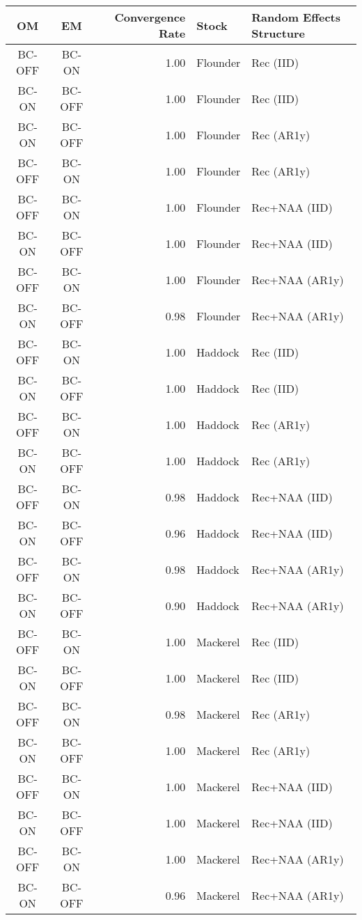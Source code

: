 \begin{table}[H]
\centering
\begin{tabular}{ccrll}
\toprule
OM & EM & Convergence Rate & Stock & Random Effects Structure \\
\midrule
BC-OFF  & BC-ON & 1.00 & Flounder & Rec (IID) \\
BC-ON  & BC-OFF & 1.00 & Flounder & Rec (IID) \\
\addlinespace
BC-ON  & BC-OFF & 1.00 & Flounder & Rec (AR1y) \\
BC-OFF  & BC-ON & 1.00 & Flounder & Rec (AR1y) \\
\addlinespace
BC-OFF  & BC-ON & 1.00 & Flounder & Rec+NAA (IID) \\
BC-ON & BC-OFF & 1.00 & Flounder & Rec+NAA (IID) \\
\addlinespace
BC-OFF & BC-ON & 1.00 & Flounder & Rec+NAA (AR1y) \\
BC-ON & BC-OFF & 0.98 & Flounder & Rec+NAA (AR1y) \\
\midrule
BC-OFF  & BC-ON & 1.00 & Haddock  & Rec (IID) \\
BC-ON  & BC-OFF & 1.00 & Haddock  & Rec (IID) \\
\addlinespace
BC-OFF  & BC-ON & 1.00 & Haddock  & Rec (AR1y) \\
BC-ON  & BC-OFF & 1.00 & Haddock  & Rec (AR1y) \\
\addlinespace
BC-OFF  & BC-ON & 0.98 & Haddock  & Rec+NAA (IID) \\
BC-ON & BC-OFF & 0.96 & Haddock  & Rec+NAA (IID) \\
\addlinespace
BC-OFF & BC-ON & 0.98 & Haddock  & Rec+NAA (AR1y) \\
BC-ON & BC-OFF & 0.90 & Haddock  & Rec+NAA (AR1y) \\
\midrule
BC-OFF  & BC-ON & 1.00 & Mackerel & Rec (IID) \\
BC-ON  & BC-OFF & 1.00 & Mackerel & Rec (IID) \\
\addlinespace
BC-OFF  & BC-ON & 0.98 & Mackerel & Rec (AR1y) \\
BC-ON  & BC-OFF & 1.00 & Mackerel & Rec (AR1y) \\
\addlinespace
BC-OFF  & BC-ON & 1.00 & Mackerel & Rec+NAA (IID) \\
BC-ON & BC-OFF & 1.00 & Mackerel & Rec+NAA (IID) \\
\addlinespace
BC-OFF & BC-ON & 1.00 & Mackerel & Rec+NAA (AR1y) \\
BC-ON & BC-OFF & 0.96 & Mackerel & Rec+NAA (AR1y) \\
\bottomrule
\end{tabular}
\end{table}